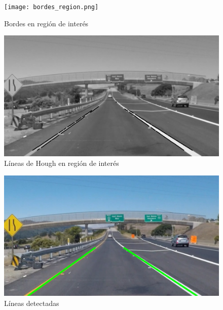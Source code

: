 \documentclass[10pt]{IEEEtran}
\begin{document}
\begin{figure}
\texttt{[image: bordes\_region.png]}
\caption{Bordes en región de interés}
\label{fig:bordes_region}
\end{figure}

\begin{figure}
\includegraphics[scale = 0.25]{hough_region.png}
\caption{Líneas de Hough en región de interés}
\label{fig:hough_region}
\end{figure}

\begin{figure}
\includegraphics[scale = 0.25]{final.png}
\caption{Líneas detectadas}
\label{fig:final}
\end{figure}
\end{document}
